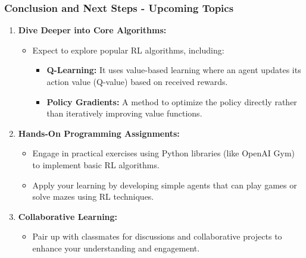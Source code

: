 \documentclass[aspectratio=169]{beamer}
\begin{document}
\begin{frame}[fragile]
    \frametitle{Conclusion and Next Steps - Upcoming Topics}
    
    \begin{enumerate}
        \item \textbf{Dive Deeper into Core Algorithms:}
        \begin{itemize}
            \item Expect to explore popular RL algorithms, including:
            \begin{itemize}
                \item \textbf{Q-Learning:} 
                It uses value-based learning where an agent updates its action value (Q-value) based on received rewards.
                \item \textbf{Policy Gradients:} 
                A method to optimize the policy directly rather than iteratively improving value functions.
            \end{itemize}
        \end{itemize}
        
        \item \textbf{Hands-On Programming Assignments:}
        \begin{itemize}
            \item Engage in practical exercises using Python libraries (like OpenAI Gym) to implement basic RL algorithms.
            \item Apply your learning by developing simple agents that can play games or solve mazes using RL techniques.
        \end{itemize}
        
        \item \textbf{Collaborative Learning:}
        \begin{itemize}
            \item Pair up with classmates for discussions and collaborative projects to enhance your understanding and engagement.
        \end{itemize}
    \end{enumerate}
\end{frame}
\end{document}
